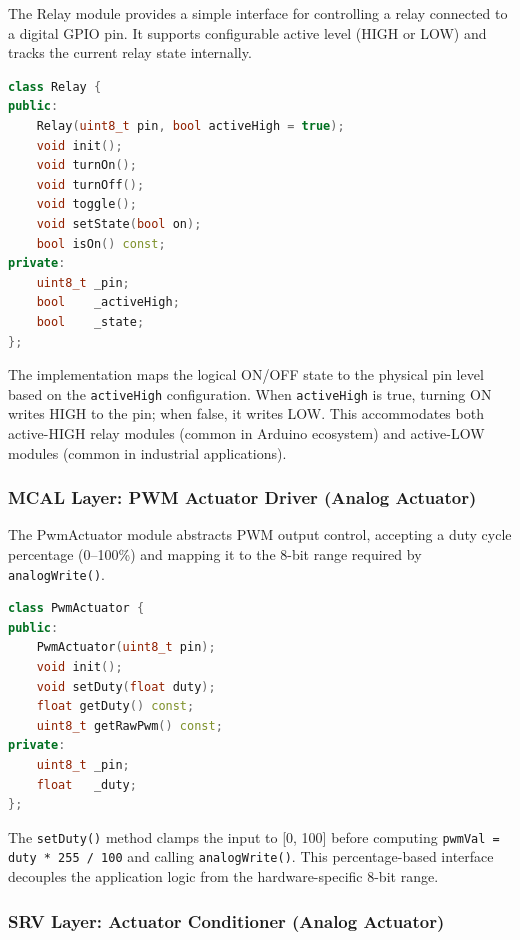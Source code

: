 The Relay module provides a simple interface for controlling a relay connected to a digital GPIO pin. It supports configurable active level (HIGH or LOW) and tracks the current relay state internally.

\begin{lstlisting}[language=C++, caption=Relay driver interface (Relay.h), label=lst:relay_h]
class Relay {
public:
    Relay(uint8_t pin, bool activeHigh = true);
    void init();
    void turnOn();
    void turnOff();
    void toggle();
    void setState(bool on);
    bool isOn() const;
private:
    uint8_t _pin;
    bool    _activeHigh;
    bool    _state;
};
\end{lstlisting}

The implementation maps the logical ON/OFF state to the physical pin level based on the \texttt{activeHigh} configuration. When \texttt{activeHigh} is true, turning ON writes HIGH to the pin; when false, it writes LOW. This accommodates both active-HIGH relay modules (common in Arduino ecosystem) and active-LOW modules (common in industrial applications).

\subsubsection{MCAL Layer: PWM Actuator Driver (Analog Actuator)}

The PwmActuator module abstracts PWM output control, accepting a duty cycle percentage (0--100\%) and mapping it to the 8-bit range required by \texttt{analogWrite()}.

\begin{lstlisting}[language=C++, caption=PwmActuator driver interface (PwmActuator.h), label=lst:pwm_actuator_h]
class PwmActuator {
public:
    PwmActuator(uint8_t pin);
    void init();
    void setDuty(float duty);
    float getDuty() const;
    uint8_t getRawPwm() const;
private:
    uint8_t _pin;
    float   _duty;
};
\end{lstlisting}

The \texttt{setDuty()} method clamps the input to [0, 100] before computing \texttt{pwmVal = duty * 255 / 100} and calling \texttt{analogWrite()}. This percentage-based interface decouples the application logic from the hardware-specific 8-bit range.

\subsubsection{SRV Layer: Actuator Conditioner (Analog Actuator)}

